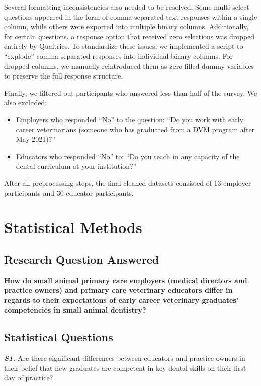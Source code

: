 \documentclass[
  11pt,
  letterpaper,
  DIV=11,
  numbers=noendperiod]{scrartcl}
\begin{document}
Several formatting inconsistencies also needed to be resolved. Some
multi-select questions appeared in the form of comma-separated text
responses within a single column, while others were exported into
multiple binary columns. Additionally, for certain questions, a response
option that received zero selections was dropped entirely by Qualtrics.
To standardize these issues, we implemented a script to ``explode''
comma-separated responses into individual binary columns. For dropped
columns, we manually reintroduced them as zero-filled dummy variables to
preserve the full response structure.

Finally, we filtered out participants who answered less than half of the
survey. We also excluded:

\begin{itemize}
\item
  Employers who responded ``No'' to the question: ``Do you work with
  early career veterinarians (someone who has graduated from a DVM
  program after May 2021)?''
\item
  Educators who responded ``No'' to: ``Do you teach in any capacity of
  the dental curriculum at your institution?''
\end{itemize}

After all preprocessing steps, the final cleaned datasets consisted of
13 employer participants and 30 educator participants.

\section{Statistical Methods}\label{statistical-methods}

\subsection{Research Question
Answered}\label{research-question-answered}

\textbf{How do small animal primary care employers (medical directors
and practice owners) and primary care veterinary educators differ in
regards to their expectations of early career veterinary graduates'
competencies in small animal dentistry?}

\subsection{Statistical Questions}\label{statistical-questions}

\textbf{\emph{S1.}} Are there significant differences between educators
and practice owners in their belief that new graduates are competent in
key dental skills on their first day of practice?
\end{document}
